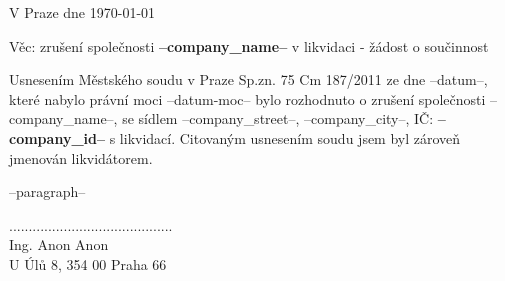 \documentclass{../static/myletter}
\begin{document}
\begin{letter}{}
\opening{V Praze dne \today}
Věc: zrušení společnosti \textbf{--company_name--} v likvidaci - žádost o součinnost                  

Usnesením Městského soudu v Praze Sp.zn. 75 Cm 187/2011 ze dne --datum--, které nabylo právní moci --datum-moc-- bylo rozhodnuto o zrušení společnosti --company_name--, se sídlem --company_street--, --company_city--,  IČ: \textbf{--company_id--} s likvidací. Citovaným usnesením soudu jsem byl zároveň jmenován likvidátorem.  

--paragraph--

\hspace*{5cm}

\closing{..........................................\\ Ing. Anon Anon \\ U Úlů 8, 354 00 Praha 66}
\end{letter}
\end{document}
